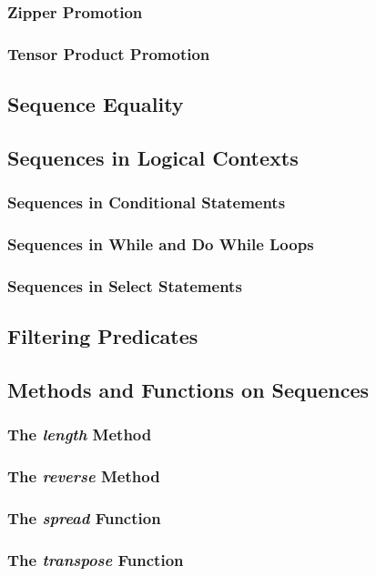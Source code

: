 \documentclass[10pt,twoside,titlepage]{article}
\begin{document}
\subsubsection{Zipper Promotion}
\subsubsection{Tensor Product Promotion}
\subsection{Sequence Equality}
\subsection{Sequences in Logical Contexts}
\subsubsection{Sequences in Conditional Statements}
\subsubsection{Sequences in While and Do While Loops}
\subsubsection{Sequences in Select Statements}
\subsection{Filtering Predicates}
\subsection{Methods and Functions on Sequences}
\subsubsection{The {\em length} Method}
\subsubsection{The {\em reverse} Method}
\subsubsection{The {\em spread} Function}
\subsubsection{The {\em transpose} Function}
\end{document}
